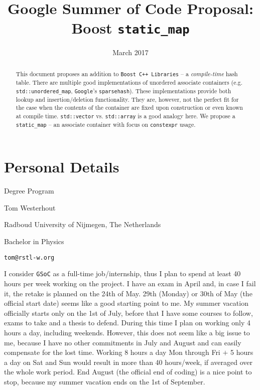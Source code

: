 \documentclass[a4paper,12pt]{article}
\title{Google Summer of Code Proposal: Boost \texttt{static\_map}}
\date{March 2017}
\begin{document}
\maketitle

\begin{abstract}
    This document proposes an addition to \texttt{Boost C++ Libraries} -- a \textit{compile-time} hash table. There are multiple good implementations of unordered associate containers (e.g. \texttt{std::unordered\_map}, \texttt{Google}'s \texttt{sparsehash}). These implementations provide both lookup and insertion/deletion functionality. They are, however, not the perfect fit for the case when the contents of the container are fixed upon construction or even known at compile time. \texttt{std::vector} vs. \texttt{std::array} is a good analogy here. We propose a \texttt{static\_map} -- an associate container with focus on \texttt{constexpr} usage.
\end{abstract}

\section{Personal Details}
    \begin{labeling}{Degree Program}
    \item [Name] Tom Westerhout
    \item [University] Radboud University of Nijmegen, The Netherlands
    \item [Degree Program] Bachelor in Physics
    \item [Email] \texttt{tom@rstl-w.org}
    \item [Availability] I consider \texttt{GSoC} as a full-time job/internship, thus I plan to spend at least 40 hours per week working on the project. I have an exam in April and, in case I fail it, the retake is planned on the 24th of May. 29th (Monday) or 30th of May (the official start date) seems like a good starting point to me. My summer vacation officially starts only on the 1st of July, before that I have some courses to follow, exams to take and a thesis to defend. During this time I plan on working only 4 hours a day, including weekends. However, this does not seem like a big issue to me, because I have no other commitments in July and August and can easily compensate for the lost time. Working 8 hours a day Mon through Fri $+$ 5 hours a day on Sat and Sun would result in more than 40 hours/week, if averaged over the whole work period. End August (the official end of coding) is a nice point to stop, because my summer vacation ends on the 1st of September.
    \end{labeling}
\end{document}
